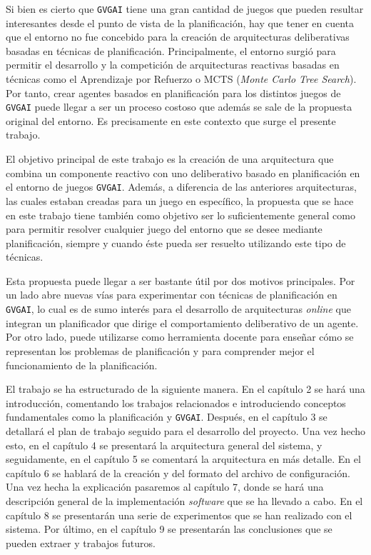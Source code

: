 Si bien es cierto que \texttt{GVGAI} tiene una gran cantidad de juegos que pueden resultar
interesantes desde el punto de vista de la planificación, hay que tener en cuenta que el entorno
no fue concebido para la creación de arquitecturas deliberativas basadas en técnicas de planificación.
Principalmente, el entorno surgió para permitir el desarrollo y la competición de arquitecturas reactivas basadas en
técnicas como el Aprendizaje por Refuerzo o MCTS (\textit{Monte Carlo Tree Search}). Por tanto, crear agentes
basados en planificación para los distintos juegos de \texttt{GVGAI} puede llegar a ser un proceso costoso que además
se sale de la propuesta original del entorno. Es precisamente en este contexto que surge el presente trabajo.

El objetivo principal de este trabajo es la creación de una arquitectura que combina un componente
reactivo con uno deliberativo basado en planificación en el entorno de juegos \texttt{GVGAI}. Además,
a diferencia de las anteriores arquitecturas, las cuales estaban creadas para un juego en específico,
la propuesta que se hace en este trabajo tiene también como objetivo ser lo suficientemente general como
para permitir resolver cualquier juego del entorno que se desee mediante planificación, siempre y
cuando éste pueda ser resuelto utilizando este tipo de técnicas.

Esta propuesta puede llegar a ser bastante útil por dos motivos principales. Por un
lado abre nuevas vías para experimentar con técnicas de planificación en \texttt{GVGAI}, lo cual es de
sumo interés para el desarrollo de arquitecturas \textit{online} que integran un planificador que
dirige el comportamiento deliberativo de un agente. Por otro lado, puede utilizarse como herramienta
docente para enseñar cómo se representan los problemas de planificación y para comprender mejor el funcionamiento
de la planificación.

El trabajo se ha estructurado de la siguiente manera. En el capítulo 2 se hará
una introducción, comentando los trabajos relacionados e introduciendo conceptos
fundamentales como la planificación y \texttt{GVGAI}. Después, en el capítulo 3 se
detallará el plan de trabajo seguido para el desarrollo del proyecto. Una vez hecho esto,
en el capítulo 4 se presentará la arquitectura general del sistema, y seguidamente, en el
capítulo 5 se comentará la arquitectura en más detalle. En el capítulo 6 se hablará de la creación
y del formato del archivo de configuración. Una vez hecha la explicación pasaremos al capítulo 7,
donde se hará una descripción general de la implementación \textit{software} que se
ha llevado a cabo. En el capítulo 8 se presentarán una serie de experimentos que
se han realizado con el sistema. Por último, en el capítulo 9 se presentarán las
conclusiones que se pueden extraer y trabajos futuros.